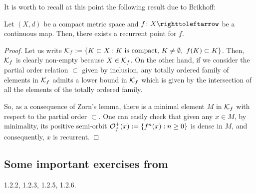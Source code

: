 It is worth to recall at this point the following result due to Brikhoff:

\begin{theorem}
  Let $(X,d)$ be a compact metric space and $f\colon X\carr$ be a continuous map. Then, there exists a recurrent point for $f$.
\end{theorem}

\begin{proof}
  Let us write $\mc{K}_f:=\{K\subset X : K \text{ is compact,}\ K\neq\emptyset,\ f(K)\subset K\}$. Then, $\mathcal{K}_f$ is clearly non-empty because $X\in\mathcal{K}_f$. On the other hand, if we consider the partial order relation $\subset$ given by inclusion, any totally ordered family of elements in $\mathcal{K}_f$ admits a lower bound in $\mathcal{K}_f$ which is given by the intersection of all the elements of the totally ordered family.

  So, as a consequence of Zorn's lemma, there is a minimal element $M$ in $\mathcal{K}_f$ with respect to the partial order $\subset$. One can easily check that given any $x\in M$, by minimality, its positive semi-orbit $\mathcal{O}_f^+(x):=\{f^n(x) : n\geq 0\}$ is dense in $M$, and consequently, $x$ is recurrent.
\end{proof}

\subsection{Some important exercises from~\cite[\S1.2.4]{VianaOliveiraFoundErgTh}}
\label{sec:some-import-exerc-1.2.4}

1.2.2, 1.2.3, 1.2.5, 1.2.6.
